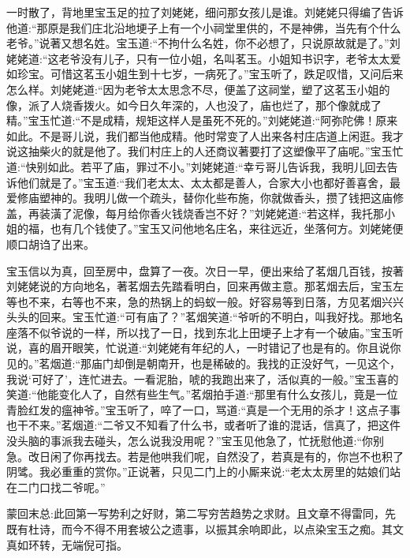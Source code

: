 \begin{parag}
    一时散了，背地里宝玉足的拉了刘姥姥，细问那女孩儿是谁。刘姥姥只得编了告诉他道:“那原是我们庄北沿地埂子上有一个小祠堂里供的，不是神佛，当先有个什么老爷。”说著又想名姓。宝玉道:“不拘什么名姓，你不必想了，只说原故就是了。”刘姥姥道:“这老爷没有儿子，只有一位小姐，名叫茗玉。小姐知书识字，老爷太太爱如珍宝。可惜这茗玉小姐生到十七岁，一病死了。”宝玉听了，跌足叹惜，又问后来怎么样。刘姥姥道:“因为老爷太太思念不尽，便盖了这祠堂，塑了这茗玉小姐的像，派了人烧香拨火。如今日久年深的，人也没了，庙也烂了，那个像就成了精。”宝玉忙道:“不是成精，规矩这样人是虽死不死的。”刘姥姥道:“阿弥陀佛！原来如此。不是哥儿说，我们都当他成精。他时常变了人出来各村庄店道上闲逛。我才说这抽柴火的就是他了。我们村庄上的人还商议著要打了这塑像平了庙呢。”宝玉忙道:“快别如此。若平了庙，罪过不小。”刘姥姥道:“幸亏哥儿告诉我，我明儿回去告诉他们就是了。”宝玉道:“我们老太太、太太都是善人，合家大小也都好善喜舍，最爱修庙塑神的。我明儿做一个疏头，替你化些布施，你就做香头，攒了钱把这庙修盖，再装潢了泥像，每月给你香火钱烧香岂不好？”刘姥姥道:“若这样，我托那小姐的福，也有几个钱使了。”宝玉又问他地名庄名，来往远近，坐落何方。刘姥姥便顺口胡诌了出来。
\end{parag}


\begin{parag}
    宝玉信以为真，回至房中，盘算了一夜。次日一早，便出来给了茗烟几百钱，按著刘姥姥说的方向地名，著茗烟去先踏看明白，回来再做主意。那茗烟去后，宝玉左等也不来，右等也不来，急的热锅上的蚂蚁一般。好容易等到日落，方见茗烟兴兴头头的回来。宝玉忙道:“可有庙了？”茗烟笑道:“爷听的不明白，叫我好找。那地名座落不似爷说的一样，所以找了一日，找到东北上田埂子上才有一个破庙。”宝玉听说，喜的眉开眼笑，忙说道:“刘姥姥有年纪的人，一时错记了也是有的。你且说你见的。”茗烟道:“那庙门却倒是朝南开，也是稀破的。我找的正没好气，一见这个，我说‘可好了’，连忙进去。一看泥胎，唬的我跑出来了，活似真的一般。”宝玉喜的笑道:“他能变化人了，自然有些生气。”茗烟拍手道:“那里有什么女孩儿，竟是一位青脸红发的瘟神爷。”宝玉听了，啐了一口，骂道:“真是一个无用的杀才！这点子事也干不来。”茗烟道:“二爷又不知看了什么书，或者听了谁的混话，信真了，把这件没头脑的事派我去碰头，怎么说我没用呢？”宝玉见他急了，忙抚慰他道:“你别急。改日闲了你再找去。若是他哄我们呢，自然没了，若真是有的，你岂不也积了阴骘。我必重重的赏你。”正说著，只见二门上的小厮来说:“老太太房里的姑娘们站在二门口找二爷呢。”
\end{parag}


\begin{parag}
    \begin{note}蒙回末总:此回第一写势利之好财，第二写穷苦趋势之求财。且文章不得雷同，先既有杜诗，而今不得不用套坡公之遗事，以振其余响即此，以点染宝玉之痴。其文真如环转，无端倪可指。\end{note}
\end{parag}

